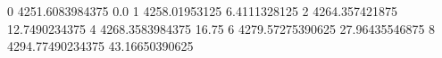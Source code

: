 0 4251.6083984375 0.0
1 4258.01953125 6.4111328125
2 4264.357421875 12.7490234375
4 4268.3583984375 16.75
6 4279.57275390625 27.96435546875
8 4294.77490234375 43.16650390625
